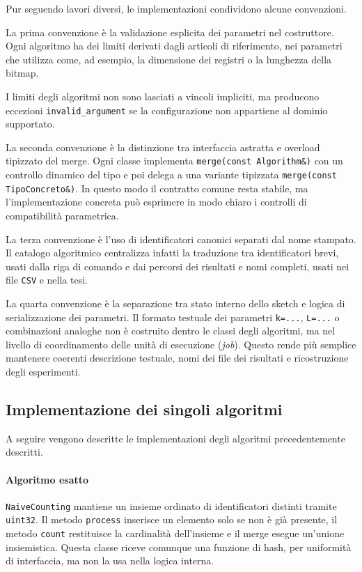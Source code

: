 Pur seguendo lavori diversi, le implementazioni condividono alcune convenzioni.

La prima convenzione è la validazione esplicita dei parametri nel costruttore. 
Ogni algoritmo ha dei limiti derivati dagli articoli di riferimento, nei parametri che utilizza 
come, ad esempio, la dimensione dei registri o la lunghezza della bitmap.

I limiti degli algoritmi non sono lasciati a vincoli
impliciti, ma producono eccezioni \texttt{invalid\_argument} se la
configurazione non appartiene al dominio supportato.

La seconda convenzione è la distinzione tra interfaccia astratta e overload
tipizzato del merge. Ogni classe implementa \texttt{merge(const Algorithm\&)}
con un controllo dinamico del tipo e poi delega a una variante tipizzata
\texttt{merge(const TipoConcreto\&)}. In questo modo il contratto comune resta
stabile, ma l'implementazione concreta può esprimere in modo chiaro i controlli
di compatibilità parametrica.

La terza convenzione è l'uso di identificatori canonici separati dal nome
stampato. Il catalogo algoritmico centralizza infatti la traduzione tra
identificatori brevi, usati dalla riga di comando e dai percorsi dei risultati
e nomi completi, usati nei file \texttt{CSV} e nella tesi.

La quarta convenzione è la separazione tra stato interno dello sketch e logica
di serializzazione dei parametri. Il formato testuale dei parametri
\texttt{k=...}, \texttt{L=...} o combinazioni analoghe non è costruito dentro le
classi degli algoritmi, ma nel livello di coordinamento delle unità di
esecuzione (\emph{job}). Questo rende
più semplice mantenere coerenti descrizione testuale, nomi dei file dei
risultati e ricostruzione degli esperimenti.

\subsection{Implementazione dei singoli algoritmi}
A seguire vengono descritte le implementazioni degli algoritmi precedentemente descritti.
\paragraph{Algoritmo esatto}
\texttt{NaiveCounting} mantiene un insieme ordinato di identificatori distinti
tramite \texttt{uint32}. Il metodo \texttt{process} inserisce un
elemento solo se non è già presente, il metodo \texttt{count} restituisce la
cardinalità dell'insieme e il merge esegue un'unione insiemistica. Questa classe
riceve comunque una funzione di hash, per uniformità di interfaccia, ma non la
usa nella logica interna.

